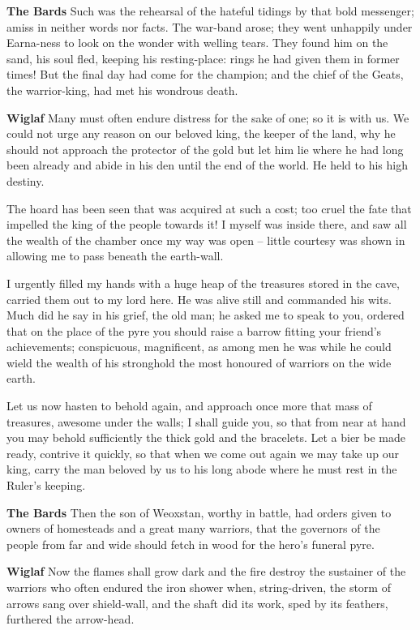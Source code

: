 \documentclass[a4paper]{article}
\begin{document}
{\textbf{The Bards} Such was the rehearsal of the hateful tidings
by that bold messenger; amiss in neither
words nor facts. The war-band arose;
they went unhappily under Earna-ness
to look on the wonder with welling tears.
They found him on the sand, his soul fled,
keeping his resting-place: rings he had given them
in former times! But the final day
had come for the champion; and the chief of the Geats,
the warrior-king, had met his wondrous death.

\textbf{Wiglaf} Many must often endure distress
for the sake of one; so it is with us.
We could not urge any reason
on our beloved king, the keeper of the land,
why he should not approach the protector of the gold
but let him lie where he had long been already
and abide in his den until the end of the world.
He held to his high destiny.

The hoard has been seen
that was acquired at such a cost; too cruel the fate
that impelled the king of the people towards it!
I myself was inside there, and saw all
the wealth of the chamber once my way was open
– little courtesy was shown in allowing me to pass
beneath the earth-wall.

I urgently filled
my hands with a huge heap of the treasures
stored in the cave, carried them out
to my lord here. He was alive still
and commanded his wits. Much did he say
in his grief, the old man; he asked me to speak to you,
ordered that on the place of the pyre you should raise
a barrow fitting your friend's achievements;
conspicuous, magnificent, as among men he was
while he could wield the wealth of his stronghold
the most honoured of warriors on the wide earth.

Let us now hasten to behold again,
and approach once more that mass of treasures,
awesome under the walls; I shall guide you,
so that from near at hand you may behold sufficiently
the thick gold and the bracelets. Let a bier be
made ready,
contrive it quickly, so that when we come out again
we may take up our king, carry the man
beloved by us to his long abode
where he must rest in the Ruler's keeping.

\textbf{The Bards} Then the son of Weoxstan, worthy in battle,
had orders given to owners of homesteads
and a great many warriors, that the governors of the people
from far and wide should fetch in wood
for the hero's funeral pyre.

\textbf{Wiglaf} Now the flames shall grow dark
and the fire destroy the sustainer of the warriors
who often endured the iron shower
when, string-driven, the storm of arrows
sang over shield-wall, and the shaft did its work,
sped by its feathers, furthered the arrow-head.

}
\end{document}
